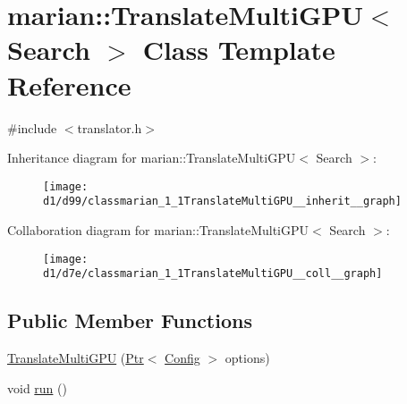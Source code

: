 \hypertarget{classmarian_1_1TranslateMultiGPU}{}\section{marian\+:\+:Translate\+Multi\+G\+PU$<$ Search $>$ Class Template Reference}
\label{classmarian_1_1TranslateMultiGPU}


{\ttfamily \#include $<$translator.\+h$>$}



Inheritance diagram for marian\+:\+:Translate\+Multi\+G\+PU$<$ Search $>$\+:
\nopagebreak
\begin{figure}[H]
\begin{center}
\leavevmode
\texttt{[image: d1/d99/classmarian\_1\_1TranslateMultiGPU\_\_inherit\_\_graph]}
\end{center}
\end{figure}


Collaboration diagram for marian\+:\+:Translate\+Multi\+G\+PU$<$ Search $>$\+:
\nopagebreak
\begin{figure}[H]
\begin{center}
\leavevmode
\texttt{[image: d1/d7e/classmarian\_1\_1TranslateMultiGPU\_\_coll\_\_graph]}
\end{center}
\end{figure}
\subsection*{Public Member Functions}
\begin{DoxyCompactItemize}
\item 
\hyperlink{classmarian_1_1TranslateMultiGPU_a4a15c6991ead6ec7515441a726cc2009}{Translate\+Multi\+G\+PU} (\hyperlink{namespacemarian_ad1a373be43a00ef9ce35666145137b08}{Ptr}$<$ \hyperlink{classmarian_1_1Config}{Config} $>$ options)
\item 
void \hyperlink{classmarian_1_1TranslateMultiGPU_a6d0b7f15fe6870b772cc9aa03d361840}{run} ()
\end{DoxyCompactItemize}

